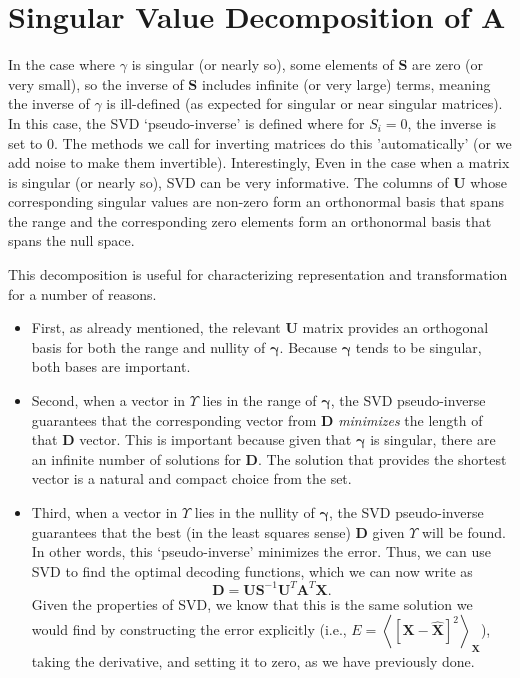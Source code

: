 \documentclass[10pt,letterpaper,oneside]{article}
\begin{document}
\section{Singular Value Decomposition of $\mathbf{A}$}

In the case where $\gamma$ is singular (or nearly so), some elements
of $\mathbf{S}$ are zero (or very small), so the inverse of $\mathbf{S}$
includes infinite (or very large) terms, meaning the inverse of $\gamma$
is ill-defined (as expected for singular or near singular matrices).
In this case, the SVD `pseudo-inverse' is defined where for $S_{i}=0$,
the inverse is set to $0$. The methods we call for inverting matrices do this 'automatically' (or we add noise to make them invertible). Interestingly, Even in the case when a matrix is singular (or nearly so), SVD can
be very informative. The columns of $\mathbf{U}$ whose corresponding
singular values are non-zero form an orthonormal basis that spans
the range and the corresponding zero elements form an orthonormal
basis that spans the null space.


This decomposition is useful for characterizing representation and
transformation for a number of reasons. 
\begin{itemize}
\item First, as already mentioned, the relevant $\mathbf{U}$ matrix provides
an orthogonal basis for both the range and nullity of $\boldsymbol{\gamma}$.
Because $\boldsymbol{\gamma}$ tends to be singular, both bases are
important. 
\item Second, when a vector in $\Upsilon$ lies in the range of $\boldsymbol{\gamma}$,
the SVD pseudo-inverse guarantees that the corresponding vector from
$\mathbf{D}$ \emph{minimizes}
the length of that $\mathbf{D}$ vector. This is important
because given that $\boldsymbol{\gamma}$ is singular, there are an
infinite number of solutions for $\mathbf{D}$. The solution
that provides the shortest vector is a natural and compact choice
from the set. 
\item Third, when a vector in $\Upsilon$ lies in the nullity of $\boldsymbol{\gamma}$,
the SVD pseudo-inverse guarantees that the best (in the least squares
sense) $\mathbf{D}$ given $\Upsilon$ will be found. In other
words, this `pseudo-inverse' minimizes the error. Thus, we can use
SVD to find the optimal decoding functions, which we can now write
as
\begin{equation}
  \mathbf{D}=\mathbf{US}^{-1}\mathbf{U}^{T}\mathbf{A}^{T}\mathbf{X}.\label{c4.eq.phi.svd}
\end{equation}
Given the properties of SVD, we know that this is the same solution
we would find by constructing the error explicitly (i.e., $E=\left\langle \left[\mathbf{X}-\hat{\mathbf{X}}\right]^{2}\right\rangle _{\mathbf{X}}$),
taking the derivative, and setting it to zero, as we have previously
done. 
\end{itemize}
\end{document}
